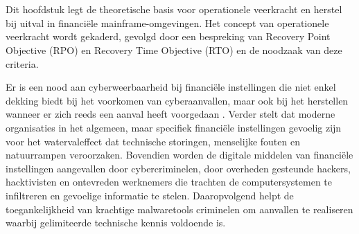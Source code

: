 \chapter{}%
\label{ch:literatuurstudie}



\section{}%
\label{sec:operationele-veerkracht}

Dit hoofdstuk legt de theoretische basis voor operationele veerkracht en herstel bij uitval in financiële mainframe-omgevingen.
Het concept van operationele veerkracht wordt gekaderd, gevolgd door een bespreking van Recovery Point Objective (RPO) en Recovery Time Objective (RTO) en de noodzaak van deze criteria.

Er is een nood aan cyberweerbaarheid bij financiële instellingen die niet enkel dekking biedt bij het voorkomen van cyberaanvallen, maar ook bij het herstellen wanneer er zich reeds een aanval heeft voorgedaan \autocite{dupont2019cyber}.
Verder stelt \textcite{dupont2019cyber} dat moderne organisaties in het algemeen, maar specifiek financiële instellingen gevoelig zijn voor het watervaleffect dat technische storingen, menselijke fouten en natuurrampen veroorzaken.
Bovendien worden de digitale middelen van financiële instellingen aangevallen door cybercriminelen, door overheden gesteunde hackers, hacktivisten en ontevreden werknemers die trachten de computersystemen te infiltreren en gevoelige informatie te stelen.
Daaropvolgend helpt de toegankelijkheid van krachtige malwaretools criminelen om aanvallen te realiseren waarbij gelimiteerde technische kennis voldoende is.

